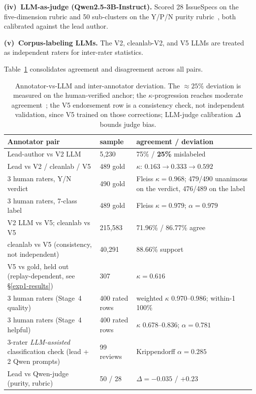 \documentclass[sigconf, anonymous]{acmart}
\begin{document}
\textbf{(iv)~LLM-as-judge (Qwen2.5-3B-Instruct).} Scored 28 IssueSpecs on the five-dimension rubric and 50 sub-clusters on the Y/P/N purity rubric~\cite{zheng2023judging}, both calibrated against the lead author.

\textbf{(v)~Corpus-labeling LLMs.} The V2, cleanlab-V2, and V5 LLMs are treated as independent raters for inter-rater statistics.

Table~\ref{tab:annot-deviation} consolidates agreement and disagreement across all pairs.

\begin{table}[t]\centering\footnotesize
  \caption{Annotator-vs-LLM and inter-annotator deviation. The $\approx 25\%$ deviation is
  measured on the human-verified anchor; the $\kappa$-progression reaches moderate
  agreement~\cite{landis1977measurement}; the V5 endorsement row is a consistency check, not independent validation, since V5 trained on those corrections;
  LLM-judge calibration $\Delta$ bounds judge bias.}\label{tab:annot-deviation}
  \begin{tabular}{@{}p{4.0cm}p{1.5cm}p{2.5cm}@{}}\toprule
  Annotator pair & sample & agreement / deviation \\\midrule
  Lead-author vs V2 LLM & 5{,}230 & 75\% / \textbf{25\%} mislabeled \\
  Lead vs V2 / cleanlab / V5 & 489 gold & $\kappa$: $0.163 \to 0.333 \to \mathbf{0.592}$ \\
  3 human raters, Y/N verdict & 490 gold & Fleiss $\kappa = \mathbf{0.968}$; 479/490 unanimous on the verdict, 476/489 on the label \\
  3 human raters, 7-class label & 489 gold & Fleiss $\kappa = \mathbf{0.979}$; $\alpha = 0.979$ \\
  V2 LLM vs V5; cleanlab vs V5 & 215{,}583 & 71.96\% / 86.77\% agree \\
  cleanlab vs V5 (consistency, not independent) & 40{,}291 & 88.66\% support \\
  V5 vs gold, held out (replay-dependent, see \S\ref{exp1-results}) & 307 & $\kappa = \mathbf{0.616}$ \\
  3 human raters (Stage~4 quality) & 400 rated rows & weighted $\kappa$ 0.970--0.986; within-1 100\% \\
  3 human raters (Stage~4 helpful) & 400 rated rows & $\kappa$ 0.678--0.836; $\alpha = 0.781$ \\
  3-rater \emph{LLM-assisted} classification check (lead + 2 Qwen prompts) & 99 reviews & Krippendorff $\alpha = 0.285$ \\
  Lead vs Qwen-judge (purity, rubric) & 50 / 28 & $\Delta = -0.035$ / $+0.23$ \\
  \bottomrule\end{tabular}\end{table}
\end{document}

